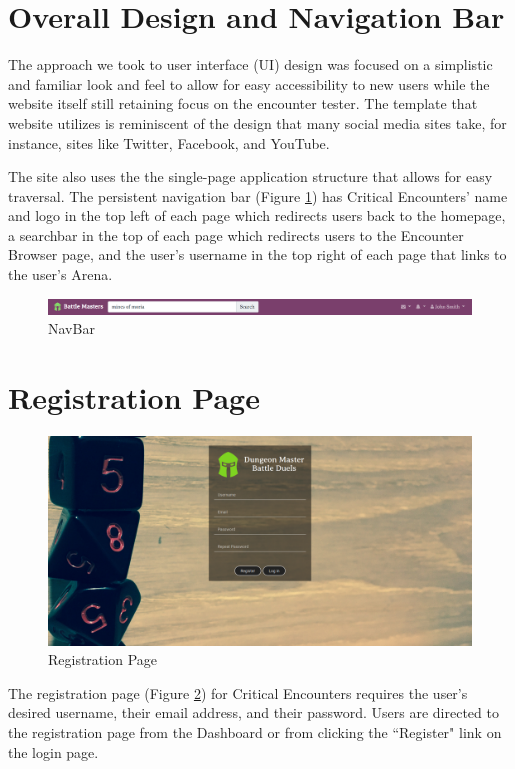 \documentclass[12pt,a4paper]{report}
\begin{document}
	\section{Overall Design and Navigation Bar}
	The approach we took to user interface (UI) design was focused on a simplistic and familiar look and feel to allow for easy accessibility to new users while the website itself still retaining focus on the encounter tester. The template that website utilizes is reminiscent of the design that many social media sites take, for instance, sites like Twitter, Facebook, and YouTube.\par
	The site also uses the the single-page application structure that allows for easy traversal. The persistent navigation bar (Figure \ref{fig: NavBar}) has Critical Encounters' name and logo in the top left of each page which redirects users back to the homepage, a searchbar in the top of each page which redirects users to the Encounter Browser page, and the user's username in the top right of each page that links to the user's Arena.
	\bigskip
	\bigskip
	\begin{figure}[H]
		\centering
		\centerline{\includegraphics[scale=.30]{navbar}}
		\caption{NavBar}
		\label{fig: NavBar}
	\end{figure}
	\section{Registration Page}
	\begin{figure}[H]
		\centering
		\includegraphics[scale=.20]{register}
		\caption{Registration Page}
		\label{fig: Registration Page}
	\end{figure}
	The registration page (Figure \ref{fig: Registration Page})  for Critical Encounters requires the user's desired username, their email address, and their password. Users are directed to the registration page from the Dashboard or from clicking the ``Register" link on the login page.
	\newpage
\end{document}
